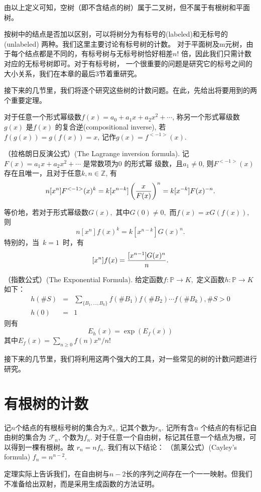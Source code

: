 \documentclass[a4paper,11pt]{article}
\begin{document}
由以上定义可知，空树（即不含结点的树）属于二叉树，但不属于有根树和平面树。

按树中的结点是否加以区别，可以将树分为有标号的(labeled)和无标号的(unlabeled) 两种。我们这里主要讨论有标号树的计数。
对于平面树及m元树，由于每个结点都是不同的，有标号树与无标号树恰好相差$n!$ 倍，因此我们只需计数对应的无标号树即可。对于有标号树，
一个很重要的问题是研究它的标号之间的大小关系，我们在本章的最后$3$节着重研究。


接下来的几节里，我们将逐个研究这些树的计数问题。在此，先给出将要用到的两个重要定理。

对于任意一个形式幂级数$f(x)=a_0+a_1x+a_2x^2+\cdots$, 称另一个形式幂级数$g(x)$ 是$f(x)$ 的复合逆(compositional inverse), 若$f(g(x))=g(f(x))=x$, 记作$g(x)=f^{<-1>}(x)$.

{\thm （拉格朗日反演公式）(The Lagrange inversion formula)\cite[p.38]{Stanley2004_2}. 记$F(x)=a_1x+a_2x^2+\cdots$ 是常数项为$0$ 的形式幂
级数，且$a_1\neq0$, 则$F^{<-1>}(x)$存在且唯一，且对于任意$k,n\in\mathbb{Z}$, 有
$$n[x^n]F^{<-1>}(x)^k=k[x^{n-k}]\left({x\over F(x)}\right)^n=k[x^{-k}]F(x)^{-n}.$$

等价地，若对于形式幂级数$G(x),$ 其中$G(0)\neq0,$  而$f(x)=xG(f(x)),$ 则
$$n[x^n]f(x)^k=k[x^{n-k}]G(x)^n.$$
特别的，当~$k=1$~时，有$$[x^n]f(x)={[x^{n-1}]G(x)^n \over n}.$$
}

{\thm （指数公式）(The Exponential Formula)\cite[p.5]{Stanley2004_2}. 给定函数$f:\mathbb{P}\rightarrow K,$ 定义函数$h:\mathbb{P}\rightarrow K$ 如下：
\begin{eqnarray*}
h(\#S)&=&\sum_{\{B_1,\ldots,B_k\}}f(\#B_1)f(\#B_2)\cdots f(\#B_k),      \#S>0\\
h(0)&=&1
\end{eqnarray*}
则有
$$E_h(x)=\exp(E_f(x))$$
其中$E_f(x)=\sum_{n\geqslant0}f(n)x^n/n!$ }

接下来的几节里，我们将利用这两个强大的工具，对一些常见的树的计数问题进行研究。
\section{有根树的计数}

记$n$个结点的有根标号树的集合为$\mathcal{R}_n$, 记其个数为$r_n$. 记所有含$n$ 个结点的有标记自由树的集合为
$\mathcal{F}_n$, 个数为$f_n$. 对于任意一个自由树，标记其任意一个结点为根，可以得到一棵有根树。故
$r_n=nf_n$. 我们有以下结论：
{
\thm （凯莱公式）(Cayley's formula)  $f_n=n^{n-2}$.
}

定理实际上告诉我们，在自由树与$n-2$长的序列之间存在一个一一映射。但我们不准备给出双射，而是采用生成函数的方法证明。
\end{document}
